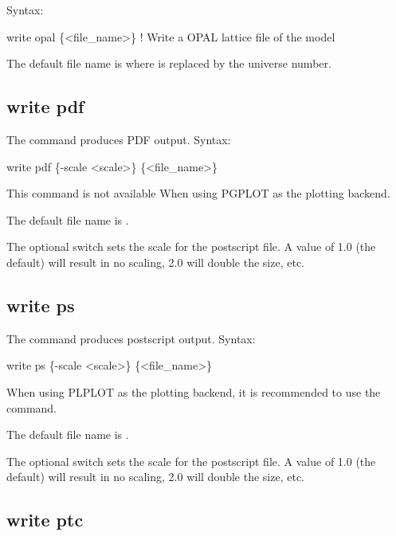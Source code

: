 {{{{{{{{{{{Syntax:
\begin{example}
    write opal \{<file_name>\}  ! Write a OPAL lattice file of the model
\end{example}

The default file name is  where \vn{\#} is replaced by the universe number. 


\subsection{write pdf}
\label{s:write.pdf}

The  command produces PDF output. Syntax:
\begin{example}
  write pdf \{-scale <scale>\} \{<file_name>\}
\end{example}
This command is not available When using PGPLOT as the plotting backend.

The default file name is . 

The optional  switch sets the scale for the postscript file. A value of 1.0 (the
default) will result in no scaling, 2.0 will double the size, etc.


\subsection{write ps}
\label{s:write.ps}

The  command produces postscript output. Syntax:
\begin{example}
  write ps \{-scale <scale>\} \{<file_name>\}
\end{example}
When using PLPLOT as the plotting backend, it is recommended to use the  command.

The default file name is . 

The optional  switch sets the scale for the postscript file. A value of 1.0 (the
default) will result in no scaling, 2.0 will double the size, etc.


\subsection{write ptc}
\label{s:write.ptc}

}}}}}}}}}}}
